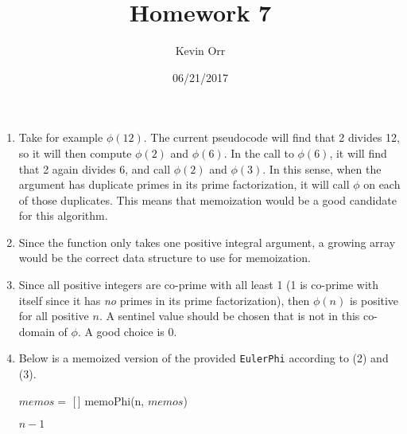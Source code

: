\documentclass[11pt]{article}
\author{Kevin Orr}
\date{06/21/2017}
\title{Homework 7}
\DeclarePairedDelimiter\floor{\lfloor}{\rfloor}
\begin{document}
\maketitle
\begin{enumerate}
\item Take for example \(\phi(12)\). The current pseudocode will find that 2 divides 12, so it will
then compute \(\phi(2)\) and \(\phi(6)\). In the call to \(\phi(6)\), it will find that 2 again divides
6, and call \(\phi(2)\) and \(\phi(3)\). In this sense, when the argument has duplicate primes in its
prime factorization, it will call \(\phi\) on each of those duplicates. This means that memoization
would be a good candidate for this algorithm.

\item Since the function only takes one positive integral argument, a growing array would be the correct
data structure to use for memoization.

\item Since all positive integers are co-prime with all least 1 (1 is co-prime with itself since it has
\emph{no} primes in its prime factorization), then \(\phi(n)\) is positive for all positive \(n\). A sentinel
value should be chosen that is not in this co-domain of \(\phi\). A good choice is 0.
\pagebreak

\item Below is a memoized version of the provided \texttt{EulerPhi} according to (2) and (3).
\begin{function}
  \DontPrintSemicolon

  $memos = $ [\,] \;
  \Return memoPhi(n, $memos$)\;
\end{function}

\begin{function}
  \DontPrintSemicolon

  \;

  \;

  \;

  \;
  \Return $n-1$\;
\end{function}
\end{enumerate}
\end{document}
